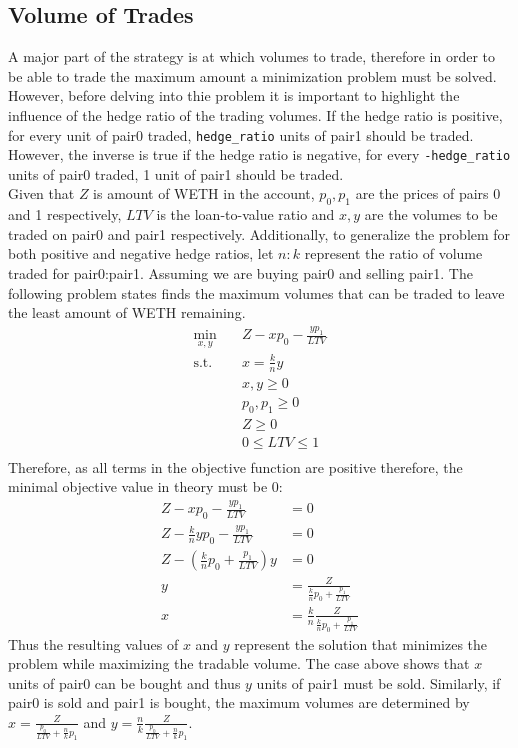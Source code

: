 \subsection{Volume of Trades}
A major part of the strategy is at which volumes to trade, therefore in order to be able to trade the maximum amount a minimization problem must be solved. However, before delving into thie problem it is important to highlight the influence of the hedge ratio of the trading volumes. If the hedge ratio is positive, for every unit of pair0 traded, \texttt{hedge\_ratio} units of pair1 should be traded. However, the inverse is true if the hedge ratio is negative, for every \texttt{-hedge\_ratio} units of pair0 traded, 1 unit of pair1 should be traded.
\\[5mm]
Given that $Z$ is amount of WETH in the account, $p_0, p_1$ are the prices of pairs 0 and 1 respectively, $LTV$ is the loan-to-value ratio and $x, y$ are the volumes to be traded on pair0 and pair1 respectively. Additionally, to generalize the problem for both positive and negative hedge ratios, let $n:k$ represent the ratio of volume traded for pair0:pair1. Assuming we are buying pair0 and selling pair1. The following problem states finds the maximum volumes that can be traded to leave the least amount of WETH remaining.
\begin{equation}
\begin{aligned}
\min_{x, y} \quad & Z - xp_0 - \frac{yp_1}{LTV}\\
\textrm{s.t.} \quad & x = \frac{k}{n}y\\
    &x, y \geq 0\\
    &p_0, p_1 \geq 0\\
    &Z \geq 0\\
    &0 \leq LTV \leq 1\\
\end{aligned}
\end{equation}
Therefore, as all terms in the objective function are positive therefore, the minimal objective value in theory must be 0:
\begin{align*}
    Z - xp_0 - \frac{yp_1}{LTV} &= 0\\
    Z - \frac{k}{n}yp_0 - \frac{yp_1}{LTV} &= 0\\
    Z - (\frac{k}{n}p_0 + \frac{p_1}{LTV})y &= 0\\
    y &= \frac{Z}{\frac{k}{n}p_0 + \frac{p_1}{LTV}}\\
    x &= \frac{k}{n}\frac{Z}{\frac{k}{n}p_0 + \frac{p_1}{LTV}}
\end{align*}
\noindent Thus the resulting values of $x$ and $y$ represent the solution that minimizes the problem while maximizing the tradable volume. The case above shows that $x$ units of pair0 can be bought and thus $y$ units of pair1 must be sold. Similarly, if pair0 is sold and pair1 is bought, the maximum volumes are determined by $x = \frac{Z}{\frac{p_0}{LTV} + \frac{n}{k}p_1}$ and $y = \frac{n}{k} \frac{Z}{\frac{p_0}{LTV} + \frac{n}{k}p_1}$.

